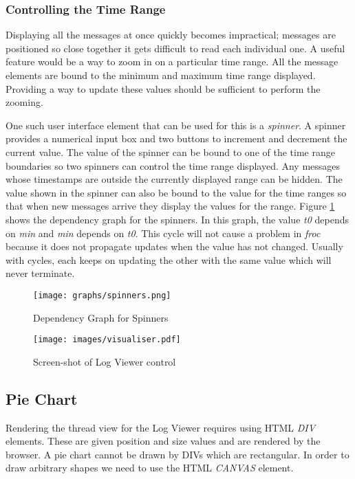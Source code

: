 \subsubsection{Controlling the Time Range}
Displaying all the messages at once quickly becomes impractical; messages are positioned so close together it gets difficult to read each individual one. A useful feature would be a way to zoom in on a particular time range. All the message elements are bound to the minimum and maximum time range displayed. Providing a way to update these values should be sufficient to perform the zooming.

One such user interface element that can be used for this is a \emph{spinner}. A spinner provides a numerical input box and two buttons to increment and decrement the current value. The value of the spinner can be bound to one of the time range boundaries so two spinners can control the time range displayed. Any messages whose timestamps are outside the currently displayed range can be hidden. The value shown in the spinner can also be bound to the value for the time ranges so that when new messages arrive they display the values for the range. Figure \ref{spinners} shows the dependency graph for the spinners. In this graph, the value \emph{t0} depends on \emph{min} and \emph{min} depends on \emph{t0}. This cycle will not cause a problem in \emph{froc} because it does not propagate updates when the value has not changed. Usually with cycles, each keeps on updating the other with the same value which will never terminate.

\begin{figure}
  \centering
  \texttt{[image: graphs/spinners.png]}
  \caption{Dependency Graph for Spinners}
  \label{spinners}
\end{figure}

\begin{figure}
  \centering
  \texttt{[image: images/visualiser.pdf]}
  \caption{Screen-shot of Log Viewer control}
  \label{fig:visualiser}
\end{figure}

\subsection{Pie Chart}
Rendering the thread view for the Log Viewer requires using HTML \emph{DIV} elements. These are given position and size values and are rendered by the browser. A pie chart cannot be drawn by DIVs which are rectangular. In order to draw arbitrary shapes we need to use the HTML \emph{CANVAS} element. 

